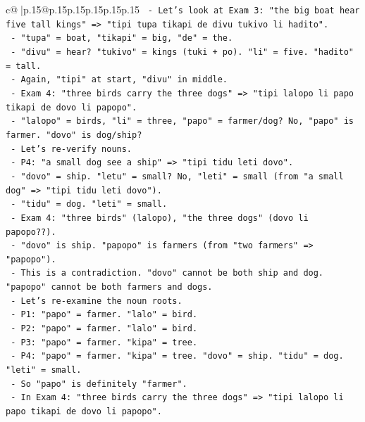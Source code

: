 \documentclass{article}
\begin{document}
{\begin{supertabular}{c@{$\;$}|p{.15\linewidth}@{}p{.15\linewidth}p{.15\linewidth}p{.15\linewidth}p{.15\linewidth}p{.15\linewidth}}
{{{\texttt{              {-} Let's look at Exam 3: "the big boat hear five tall kings" => "tipi tupa tikapi de divu tukivo li hadito".} \\
\texttt{                {-} "tupa" = boat, "tikapi" = big, "de" = the.} \\
\texttt{                {-} "divu" = hear? "tukivo" = kings (tuki + po). "li" = five. "hadito" = tall.} \\
\texttt{                {-} Again, "tipi" at start, "divu" in middle.} \\
\texttt{              {-} Exam 4: "three birds carry the three dogs" => "tipi lalopo li papo tikapi de dovo li papopo".} \\
\texttt{                {-} "lalopo" = birds, "li" = three, "papo" = farmer/dog? No, "papo" is farmer. "dovo" is dog/ship?} \\
\texttt{                {-} Let's re{-}verify nouns.} \\
\texttt{                {-} P4: "a small dog see a ship" => "tipi tidu leti dovo".} \\
\texttt{                  {-} "dovo" = ship. "letu" = small? No, "leti" = small (from "a small dog" => "tipi tidu leti dovo").} \\
\texttt{                  {-} "tidu" = dog. "leti" = small.} \\
\texttt{                {-} Exam 4: "three birds" (lalopo), "the three dogs" (dovo li papopo??).} \\
\texttt{                  {-} "dovo" is ship. "papopo" is farmers (from "two farmers" => "papopo").} \\
\texttt{                  {-} This is a contradiction. "dovo" cannot be both ship and dog. "papopo" cannot be both farmers and dogs.} \\
\texttt{                  {-} Let's re{-}examine the noun roots.} \\
\texttt{                  {-} P1: "papo" = farmer. "lalo" = bird.} \\
\texttt{                  {-} P2: "papo" = farmer. "lalo" = bird.} \\
\texttt{                  {-} P3: "papo" = farmer. "kipa" = tree.} \\
\texttt{                  {-} P4: "papo" = farmer. "kipa" = tree. "dovo" = ship. "tidu" = dog. "leti" = small.} \\
\texttt{                  {-} So "papo" is definitely "farmer".} \\
\texttt{                  {-} In Exam 4: "three birds carry the three dogs" => "tipi lalopo li papo tikapi de dovo li papopo".} \\
}}}
\end{supertabular}}
\end{document}
